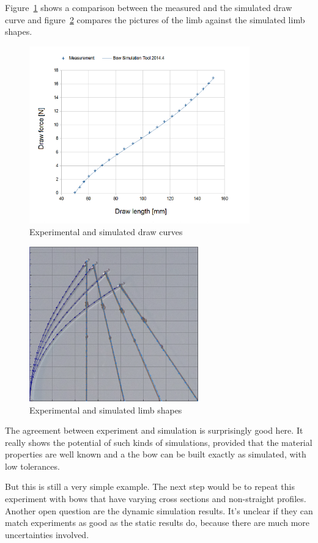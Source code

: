 Figure~\ref{fig:validation:draw_curve} shows a comparison between the measured and the simulated draw curve and figure~\ref{fig:validation:limb_shapes} compares the pictures of the limb against the simulated limb shapes.

\begin{figure}[H]
\centering
\includegraphics[width=0.85\textwidth]{figures/validation/draw_curve.png}
\caption{Experimental and simulated draw curves}
\label{fig:validation:draw_curve}
\end{figure}

\begin{figure}[H]
\centering
\includegraphics[width=0.65\textwidth]{figures/validation/states_blended.png}
\caption{Experimental and simulated limb shapes}
\label{fig:validation:limb_shapes}
\end{figure}

The agreement between experiment and simulation is surprisingly good here.
It really shows the potential of such kinds of simulations, provided that the material properties are well known and a the bow can be built exactly as simulated, with low tolerances.

But this is still a very simple example.
The next step would be to repeat this experiment with bows that have varying cross sections and non-straight profiles.
Another open question are the dynamic simulation results.
It's unclear if they can match experiments as good as the static results do, because there are much more uncertainties involved.